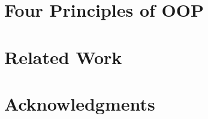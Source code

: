 \documentclass[acmsmall,nonacm,11pt]{acmart}
\begin{document}
\section{Four Principles of OOP}
\label{sec:four}


\section{Related Work}
\label{sec:related}


\section{Acknowledgments}


{\raggedright

}
\vfill\eject

\appendix



\end{document}
